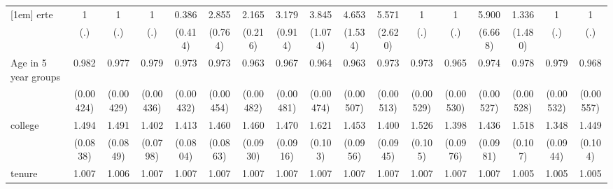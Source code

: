 {\begin{tabular}{l*{16}{c}}
[1em]
erte                &           1         &           1         &           1         &       0.386         &       2.855\sym{***}&       2.165\sym{***}&       3.179\sym{***}&       3.845\sym{***}&       4.653\sym{***}&       5.571\sym{***}&           1         &           1         &       5.900         &       1.336         &           1         &           1         \\
                    &         (.)         &         (.)         &         (.)         &     (0.414)         &     (0.764)         &     (0.216)         &     (0.914)         &     (1.074)         &     (1.534)         &     (2.620)         &         (.)         &         (.)         &     (6.668)         &     (1.480)         &         (.)         &         (.)         \\
[1em]
Age in 5 year groups&       0.982\sym{***}&       0.977\sym{***}&       0.979\sym{***}&       0.973\sym{***}&       0.973\sym{***}&       0.963\sym{***}&       0.967\sym{***}&       0.964\sym{***}&       0.963\sym{***}&       0.973\sym{***}&       0.973\sym{***}&       0.965\sym{***}&       0.974\sym{***}&       0.978\sym{***}&       0.979\sym{***}&       0.968\sym{***}\\
                    &   (0.00424)         &   (0.00429)         &   (0.00436)         &   (0.00432)         &   (0.00454)         &   (0.00482)         &   (0.00481)         &   (0.00474)         &   (0.00507)         &   (0.00513)         &   (0.00529)         &   (0.00530)         &   (0.00527)         &   (0.00528)         &   (0.00532)         &   (0.00557)         \\
[1em]
college             &       1.494\sym{***}&       1.491\sym{***}&       1.402\sym{***}&       1.413\sym{***}&       1.460\sym{***}&       1.460\sym{***}&       1.470\sym{***}&       1.621\sym{***}&       1.453\sym{***}&       1.400\sym{***}&       1.526\sym{***}&       1.398\sym{***}&       1.436\sym{***}&       1.518\sym{***}&       1.348\sym{***}&       1.449\sym{***}\\
                    &    (0.0838)         &    (0.0849)         &    (0.0798)         &    (0.0804)         &    (0.0863)         &    (0.0930)         &    (0.0916)         &     (0.103)         &    (0.0956)         &    (0.0945)         &     (0.105)         &    (0.0976)         &    (0.0981)         &     (0.107)         &    (0.0944)         &     (0.104)         \\
[1em]
tenure              &       1.007\sym{***}&       1.006\sym{***}&       1.007\sym{***}&       1.007\sym{***}&       1.007\sym{***}&       1.007\sym{***}&       1.007\sym{***}&       1.007\sym{***}&       1.007\sym{***}&       1.007\sym{***}&       1.007\sym{***}&       1.007\sym{***}&       1.007\sym{***}&       1.005\sym{***}&       1.005\sym{***}&       1.005\sym{***}\\

\end{tabular}}
